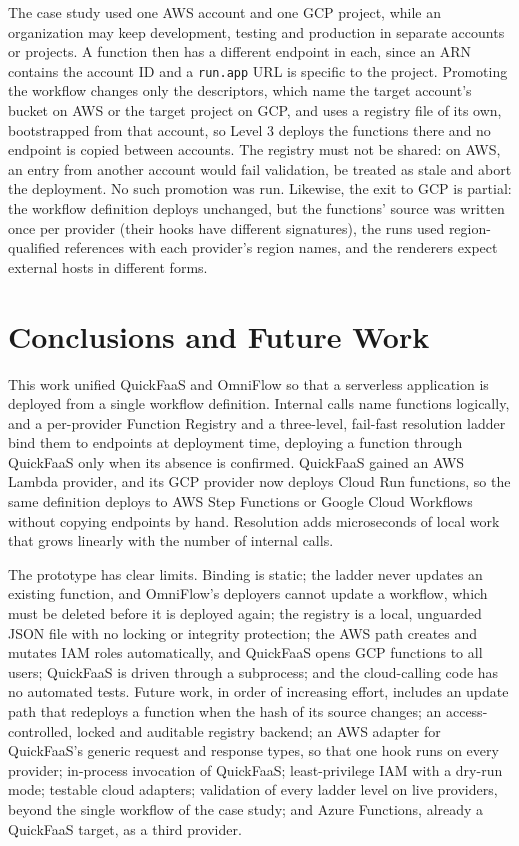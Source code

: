 \documentclass[conference]{IEEEtran}
\begin{document}
The case study used one AWS account and one GCP project, while an organization may keep
development, testing and production in separate accounts or projects. A function then has a
different endpoint in each, since an ARN contains the account ID and a \texttt{run.app} URL is
specific to the project. Promoting the workflow changes only the descriptors, which name the target
account's bucket on AWS or the target project on GCP, and uses a registry file of its own,
bootstrapped from that account, so Level 3 deploys the functions there and no endpoint is copied
between accounts. The registry must not be shared: on AWS, an entry from another account would
fail validation, be treated as stale and abort the deployment. No such promotion was run.
Likewise, the exit to GCP is partial: the workflow definition deploys unchanged, but the functions'
source was written once per provider (their hooks have different signatures), the runs used
region-qualified references with each provider's region names, and the renderers expect external
hosts in different forms.

\section{Conclusions and Future Work}
\label{sec:concl}

This work unified QuickFaaS and OmniFlow so that a serverless application is deployed from a single
workflow definition. Internal calls name functions logically, and a per-provider Function Registry
and a three-level, fail-fast resolution ladder bind them to endpoints at deployment time,
deploying a function through QuickFaaS only when its absence is confirmed. QuickFaaS gained an AWS
Lambda provider, and its GCP provider now deploys Cloud Run functions, so the same definition
deploys to AWS Step Functions or Google Cloud Workflows without copying endpoints by hand. Resolution adds microseconds of local work that grows linearly with the number
of internal calls.

The prototype has clear limits. Binding is static; the ladder never updates an existing function,
and OmniFlow's deployers cannot update a workflow, which must be deleted before it is deployed
again;
the registry is a local, unguarded JSON file with no locking or integrity protection; the AWS path
creates and mutates IAM roles automatically, and QuickFaaS opens GCP functions to all users;
QuickFaaS is driven through a subprocess; and the cloud-calling code has no automated tests. Future
work, in order of increasing effort, includes an update path that redeploys a function when the hash
of its source changes; an access-controlled, locked and auditable registry backend;
an AWS adapter for QuickFaaS's generic request and response types, so that one hook runs on
every provider; in-process invocation of QuickFaaS; least-privilege IAM with a dry-run mode; testable cloud
adapters; validation of every ladder level on live providers, beyond the single workflow of the
case study; and Azure Functions,
already a QuickFaaS target, as a third provider.



\end{document}

